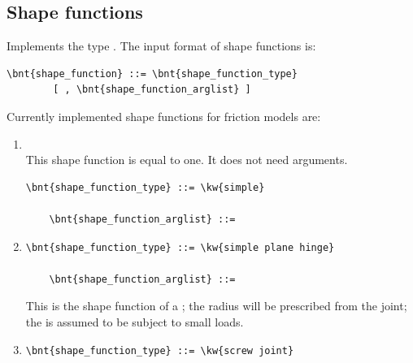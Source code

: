 \subsection{Shape functions}
\label{sec:shape function}
Implements the type .
The input format of shape functions is:
\begin{Verbatim}[commandchars=\\\{\}]
    \bnt{shape_function} ::= \bnt{shape_function_type}
        [ , \bnt{shape_function_arglist} ]
\end{Verbatim}
Currently implemented shape functions for friction models are:
\begin{enumerate}
    \item {}\\
    This shape function is equal to one. It does not need arguments.
\begin{Verbatim}[commandchars=\\\{\}]
    \bnt{shape_function_type} ::= \kw{simple}

    \bnt{shape_function_arglist} ::=
\end{Verbatim}

    \item {}
\begin{Verbatim}[commandchars=\\\{\}]
    \bnt{shape_function_type} ::= \kw{simple plane hinge}

    \bnt{shape_function_arglist} ::= 
\end{Verbatim}
    This is the shape function of a ; the radius will be prescribed from the
    joint; the  is assumed to be subject to small loads.

    \item {}
\begin{Verbatim}[commandchars=\\\{\}]
    \bnt{shape_function_type} ::= \kw{screw joint}


\end{Verbatim}
\end{enumerate}
